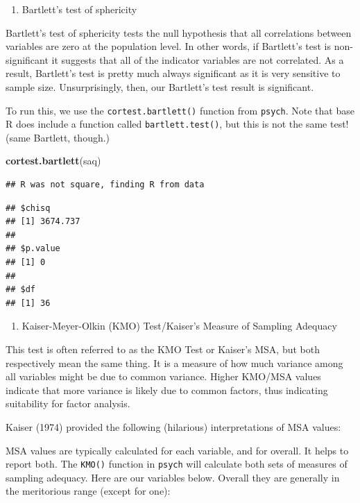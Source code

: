 \documentclass[
]{book}
\newenvironment{Shaded}{\begin{snugshade}}{\end{snugshade}}
\newcommand{\FunctionTok}[1]{\textcolor[rgb]{0.13,0.29,0.53}{\textbf{#1}}}
\newcommand{\NormalTok}[1]{#1}
\providecommand{\tightlist}{%
  \setlength{\itemsep}{0pt}\setlength{\parskip}{0pt}}
\begin{document}
\begin{enumerate}
\def\labelenumi{\arabic{enumi}.}
\setcounter{enumi}{1}
\tightlist
\item
  Bartlett's test of sphericity
\end{enumerate}

Bartlett's test of sphericity tests the null hypothesis that all correlations between variables are zero at the population level. In other words, if Bartlett's test is non-significant it suggests that all of the indicator variables are not correlated. As a result, Bartlett's test is pretty much always significant as it is very sensitive to sample size. Unsurprisingly, then, our Bartlett's test result is significant.

To run this, we use the \texttt{cortest.bartlett()} function from \texttt{psych}. Note that base R does include a function called \texttt{bartlett.test()}, but this is not the same test! (same Bartlett, though.)

\begin{Shaded}
\begin{Highlighting}[]
\FunctionTok{cortest.bartlett}\NormalTok{(saq)}
\end{Highlighting}
\end{Shaded}

\begin{verbatim}
## R was not square, finding R from data
\end{verbatim}

\begin{verbatim}
## $chisq
## [1] 3674.737
## 
## $p.value
## [1] 0
## 
## $df
## [1] 36
\end{verbatim}

\begin{enumerate}
\def\labelenumi{\arabic{enumi}.}
\setcounter{enumi}{2}
\tightlist
\item
  Kaiser-Meyer-Olkin (KMO) Test/Kaiser's Measure of Sampling Adequacy
\end{enumerate}

This test is often referred to as the KMO Test or Kaiser's MSA, but both respectively mean the same thing. It is a measure of how much variance among all variables might be due to common variance. Higher KMO/MSA values indicate that more variance is likely due to common factors, thus indicating suitability for factor analysis.

Kaiser (1974) provided the following (hilarious) interpretations of MSA values:

MSA values are typically calculated for each variable, and for overall. It helps to report both. The \texttt{KMO()} function in \texttt{psych} will calculate both sets of measures of sampling adequacy. Here are our variables below. Overall they are generally in the meritorious range (except for one):
\end{document}
